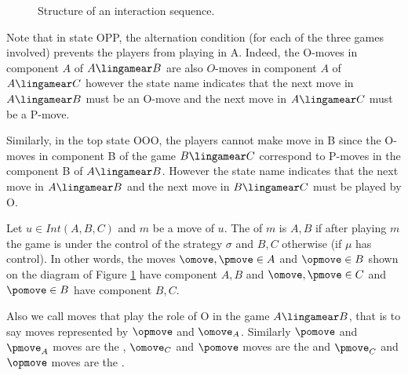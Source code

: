 \begin{figure}[htbp]
\begin{center}
\end{center}
\caption{Structure of an interaction sequence.} \label{fig:interseq}
\end{figure}

Note that in state OPP, the alternation condition (for each of the
three games involved) prevents the players from playing in A.
Indeed, the O-moves in component $A$ of $A\lingamear B$ are also
$O$-moves in component $A$ of $A\lingamear C$ however the state name
indicates that the next move in $A\lingamear B$ must be an O-move
and the next move in $A\lingamear C$ must be a P-move.

Similarly, in the top state OOO, the players cannot make move in B
since the O-moves in component B of the game $B\lingamear C$
correspond to P-moves in the component B of $A\lingamear B$. However
the state name indicates that the next move in $A\lingamear B$ and
the next move in $B\lingamear C$ must be played by O.


Let $u \in Int(A,B,C)$ and $m$ be a move of $u$. The
 of $m$ is $A,B$ if after playing $m$ the game is
under the control of the strategy $\sigma$ and $B,C$ otherwise (if
$\mu$ has control). In other words, the moves $\omove, \pmove \in A$
and $\opmove \in B$ shown on the diagram of Figure
\ref{fig:interseq} have component $A,B$ and $\omove, \pmove \in C$
and $\pomove \in B$ have component $B,C$.


Also we call  moves
that play the role of O in the game $A\lingamear B$, that is to say
moves represented by $\opmove$ and $\omove_A$. Similarly $\pomove$
and $\pmove_A$ moves are the , $\omove_C$ and $\pomove$ moves are the
 and  $\pmove_C$ and
$\opmove$ moves are the .

